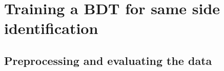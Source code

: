 \section{Training a BDT for same side identification}

\subsection{Preprocessing and evaluating the data}


